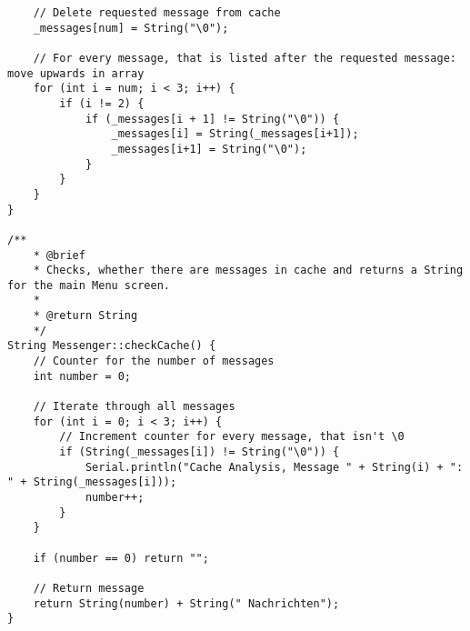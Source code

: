 \documentclass[a4paper, 11pt]{scrartcl}
\begin{document}
\begin{lstlisting}
    // Delete requested message from cache
    _messages[num] = String("\0");

    // For every message, that is listed after the requested message: move upwards in array
    for (int i = num; i < 3; i++) {
        if (i != 2) {
            if (_messages[i + 1] != String("\0")) {
                _messages[i] = String(_messages[i+1]);
                _messages[i+1] = String("\0");
            }
        }
    }
}

/**
    * @brief 
    * Checks, whether there are messages in cache and returns a String for the main Menu screen.
    * 
    * @return String 
    */
String Messenger::checkCache() {
    // Counter for the number of messages
    int number = 0;

    // Iterate through all messages
    for (int i = 0; i < 3; i++) {
        // Increment counter for every message, that isn't \0
        if (String(_messages[i]) != String("\0")) {
            Serial.println("Cache Analysis, Message " + String(i) + ": " + String(_messages[i]));
            number++;
        }
    }

    if (number == 0) return "";

    // Return message
    return String(number) + String(" Nachrichten");
}
\end{lstlisting}
\end{document}
